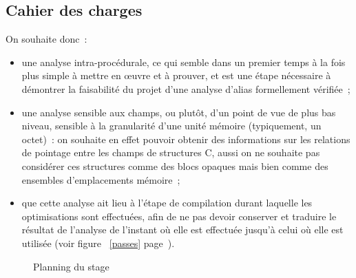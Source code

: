 \documentclass{article}
\begin{document}
\subsection{Cahier des charges}

On souhaite donc~:

\begin{itemize}

\item une analyse intra-procédurale, ce qui semble dans un premier temps à la
fois plus simple à mettre en œuvre et à prouver, et est une étape nécessaire à
démontrer la faisabilité du projet d'une analyse d'alias formellement
vérifiée~;

\item une analyse sensible aux champs, ou plutôt, d'un point de vue de plus bas
niveau, sensible à la granularité d'une unité mémoire (typiquement, un octet)~:
on souhaite en effet pouvoir obtenir des informations sur les relations de
pointage entre les champs de structures C, aussi on ne souhaite pas considérer
ces structures comme des blocs opaques mais bien comme des ensembles
d'emplacements mémoire~;

\item que cette analyse ait lieu à l'étape de compilation durant laquelle les
optimisations sont effectuées, afin de ne pas devoir conserver et traduire le
résultat de l'analyse de l'instant où elle est effectuée jusqu'à celui où elle
est utilisée (voir figure ~\ref{passes} page~\pageref{passes}).

\end{itemize}

\begin{figure}[h]
\begin{gantt}{6}{10}
\begin{ganttitle}
\end{ganttitle}
\begin{ganttitle}
\end{ganttitle}
\end{gantt}
\caption{Planning du stage}
\end{figure}

\newpage
\end{document}
